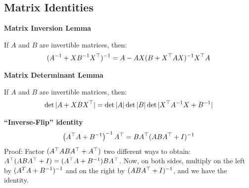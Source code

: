 \documentclass[10pt]{article}
\begin{document}
\begin{appendices}


\subsection{Matrix Identities}

{\bf   Matrix Inversion Lemma}

If $A$ and $B$ are invertible matrices, then:
\begin{equation}
      \label{eq:mil}
(A^{-1} + X B^{-1} X^\top)^{-1}  = A - A X(B+X^\top A X)^{-1} X^\top A  
\end{equation}

{\bf   Matrix Determinant Lemma}

If $A$ and $B$ are invertible matrices, then:
\begin{equation}
    \label{eq:mdl}
  \det |A + X B X^\top|  = \det|A| \det|B| \det |X ^\top A^{-1} X + B^{-1}|
\end{equation}

{\bf ``Inverse-Flip'' identity}
\begin{equation}
   \left(A^{\top} A+B^{-1}\right)^{-1} A^{\top} = BA^\top (ABA^{\top} + I)^{-1}
\end{equation}
    Proof: Factor $(A^\top A B A^\top + A^\top)$ two different ways to obtain: $A^\top (ABA^\top + I) = (A^\top
    A + B^{-1}) B A^\top$.  Now, on both sides, multiply on the left by $(A^T A + B^{-1})^{-1}$ and on the right by $(ABA^\top + I)^{-1}$, and we have the identity.

\end{appendices}
 
 

%

\end{document}
